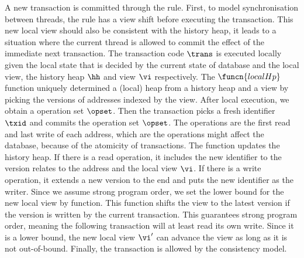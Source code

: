 


A new transaction is committed through the  rule.
First, to model synchronisation between threads, the  rule has a view shift before executing the transaction.
This new local view should also be consistent with the history heap, \ie it leads to a situation where the current thread is allowed to commit the effect of the immediate next transaction.
The transaction code \( \trans \) is executed locally given the local state that is decided by the current state of database and the local view, \ie the history heap \( \hh \) and view \( \vi \) respectively.
The \( \funcn{localHp} \) function uniquely determined a (local) heap from a history heap and a view by picking the versions of addresses indexed by the view.
After local execution, we obtain a operation set \( \opset \).
Then the transaction picks a fresh identifier \( \txid \) and commits the operation set \( \opset \).
The operations are the first read and last write of each address, which are the operations might affect the database, because of the atomicity of transactions.
The  function updates the history heap.
If there is a read operation, it includes the new identifier to the version relates to the address and the local view \( \vi \).
If there is a write operation, it extends a new version to the end and puts the new identifier as the writer.
Since we assume strong program order, we set the lower bound for the new local view by  function.
This function shifts the view to the latest version if the version is written by the current transaction.
This guarantees strong program order, meaning the following transaction will at least read its own write.
Since it is a lower bound, the new local view \( \vi' \) can advance the view as long as it is not out-of-bound.
Finally, the transaction is allowed by the consistency model.

